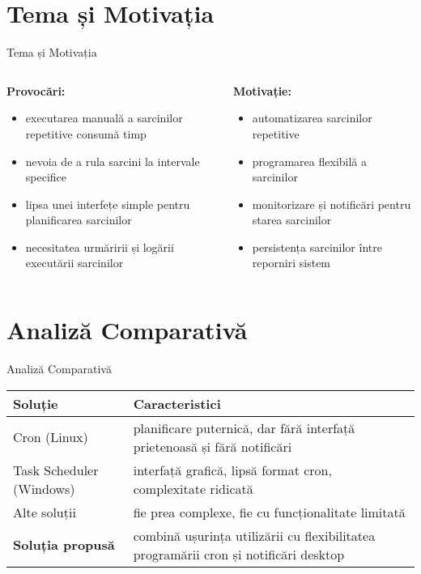 \documentclass[aspectratio=169]{beamer}
\begin{document}
\section{Tema și Motivația}
\begin{frame}{Tema și Motivația}
  \begin{columns}
    \begin{column}{0.5\textwidth}
      \textbf{Provocări:}
      \begin{itemize}
        \item executarea manuală a sarcinilor repetitive consumă timp
        \item nevoia de a rula sarcini la intervale specifice
        \item lipsa unei interfețe simple pentru planificarea sarcinilor
        \item necesitatea urmăririi și logării executării sarcinilor
      \end{itemize}
    \end{column}
    \begin{column}{0.5\textwidth}
      \textbf{Motivație:}
      \begin{itemize}
        \item automatizarea sarcinilor repetitive
        \item programarea flexibilă a sarcinilor
        \item monitorizare și notificări pentru starea sarcinilor
        \item persistența sarcinilor între reporniri sistem
      \end{itemize}
    \end{column}
  \end{columns}
\end{frame}

\section{Analiză Comparativă}
\begin{frame}{Analiză Comparativă}
  \begin{tabular}{p{} p{}}
    \toprule
    \textbf{Soluție} & \textbf{Caracteristici} \\
    \midrule
    Cron (Linux) & planificare puternică, dar fără interfață prietenoasă și fără notificări \\
    \hline
    Task Scheduler (Windows) & interfață grafică, lipsă format cron, complexitate ridicată \\
    \hline
    Alte soluții & fie prea complexe, fie cu funcționalitate limitată \\
    \hline
    \textbf{Soluția propusă} & combină ușurința utilizării cu flexibilitatea programării cron și notificări desktop \\
    \bottomrule
  \end{tabular}
\end{frame}
\end{document}
